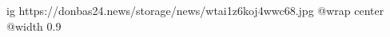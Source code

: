  
 
 
 
 

\ifcmt
  ig https://donbas24.news/storage/news/wtai1z6koj4wwc68.jpg
  @wrap center
  @width 0.9
\fi
